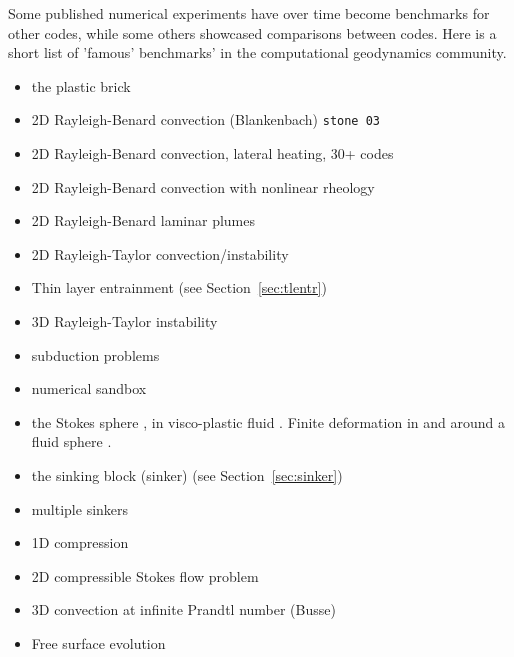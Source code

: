 Some published numerical experiments have over time become benchmarks for other codes, while some 
others showcased comparisons between codes. Here is a short list of 'famous' benchmarks' in the 
computational geodynamics community.

\begin{itemize}
\item the plastic brick \cite{lemm08,kaus10,qurj09,mishin11,muso11,maie12,spmw16,gltf18,frbt19}
\item 2D Rayleigh-Benard convection (Blankenbach)  \cite{blbc89,ogaw93,trha98,chhl08,king09,lezh11,vyrc13,trab90,bepo10,chgs02} {\tt stone 03}
\item 2D Rayleigh-Benard convection, lateral heating, 30+ codes \cite{dejo83}
\item 2D Rayleigh-Benard convection with nonlinear rheology \cite{tosn15,aspectmanual}
\item 2D Rayleigh-Benard laminar plumes \cite{vavl09}
\item 2D Rayleigh-Taylor convection/instability \cite{pros81,trab90,wesc92,popo92,ogaw93,soga01,bast02,taki03,bomh06}
      \cite{basd08,qurj09,saev10,sunh10,como97,lezh11,lomw12,vyrc13,vaks97,bomh06,chtl13,deka08,mishin11,ropu19,robe19}
      \cite{maie12,fusc13,devv00a,dadh07,demh19,aspectmanual}
\item Thin layer entrainment (see Section~\ref{sec:tlentr})
\item 3D Rayleigh-Taylor instability \cite{fukk08,vosc15}
\item subduction problems \cite{scbe08,vack08,cehg14}
\item numerical sandbox \cite{bbeg06,maie12,busa16,gltf18}
\item the Stokes sphere \cite{galemanual,aspectmanual}, in visco-plastic fluid \cite{limd02,demj04}. 
      Finite deformation in and around a fluid sphere \cite{sccm88,crud88}.
\item the sinking block (sinker) \cite{thie11,cehg14,gery10,geyu03,mamo08,mishin11,fumt11,maie12} (see Section~\ref{sec:sinker})
\item multiple sinkers \cite{mabl14,mabl15}
\item 1D compression \cite{modm02}
\item 2D compressible Stokes flow problem \cite{itki94,tagu07,lezh08,kilv10,lizh13}
\item 3D convection at infinite Prandtl number (Busse) \cite{bucc93,trha98,onmm06,krhb12}
\item Free surface evolution \cite{crsg12,aspectmanual}

\end{itemize}
